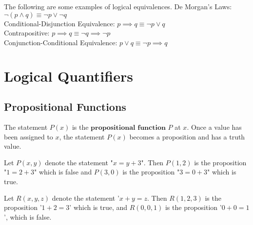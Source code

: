 \documentclass{article}
\newtheorem{definition}{Definition}[subsection]
\newtheorem{remark}{Remark}[subsection]
\newtheorem{example}{Example}[subsection]
\begin{document}
\begin{tcolorbox}
[colback=cyan!5!white,colframe=cyan!75!black,title=\begin{remark}
\end{remark}]
The following are some examples of logical equivalences.
De Morgan's Laws: $\neg (p\wedge q)\equiv \neg p\lor \neg q$\\
Conditional-Disjunction Equivalence: $p\implies q\equiv \neg p\lor q$\\
Contrapositive: $p\implies q\equiv \neg q\implies \neg p$\\
Conjunction-Conditional Equivalence: $p\lor q\equiv\neg p\implies q$
\end{tcolorbox}
\section{Logical Quantifiers}
\subsection{Propositional Functions}
\begin{tcolorbox}
[colback=blue!5!white,colframe=blue!75!black,title=\begin{definition}
\end{definition}]
The statement $P(x)$ is the $\textbf{propositional function}$ $P$ at $x$. Once a value has been assigned to $x$, the statement $P(x)$ becomes a proposition and has a truth value.
\end{tcolorbox}
\begin{tcolorbox}
[colback=red!5!white,colframe=red!75!black,title=\begin{example}
\end{example}]
Let $P(x,y)$ denote the statement "$x=y+3$". Then $P(1,2)$ is the proposition "$1=2+3$" which is false and $P(3,0)$ is the proposition "$3=0+3$" which is true.
\end{tcolorbox}
\begin{tcolorbox}
[colback=red!5!white,colframe=red!75!black,title=\begin{example}
\end{example}]
Let $R(x,y,z)$ denote the statement '$x+y=z$. Then $R(1,2,3)$ is the proposition '$1+2=3$' which is true, and $R(0,0,1)$ is the proposition '$0+0=1$', which is false.
\end{tcolorbox}
\end{document}
